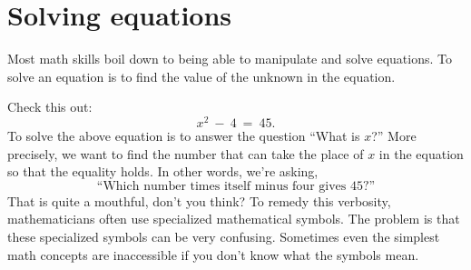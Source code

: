
\section{Solving equations}
\label{sec:solving_equations}

Most math skills boil down to being able to manipulate and solve equations. 
To solve an equation is to find the value of the unknown in the equation.  

Check this  out:
\[
 x^2 \ - \ 4 \ = \ 45.
\]
To solve the above equation is to answer
the question ``What is $x$?''
More precisely, we want to find the number that can take the 
place of $x$ in the equation so that the equality holds.
In other words, we're asking,
\[
  \text{``Which number times itself minus four gives 45?''}
\]
That is quite a mouthful, don't you think? 
To remedy this verbosity, mathematicians often use specialized mathematical symbols.  
The problem is that these specialized symbols can be very confusing. 
Sometimes even the simplest math concepts are inaccessible if you don't know what the symbols mean. 



